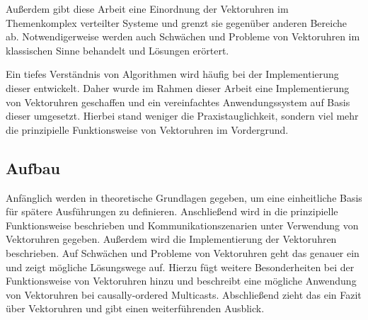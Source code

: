 Außerdem gibt diese Arbeit eine Einordnung der Vektoruhren im Themenkomplex verteilter Systeme und grenzt sie gegenüber anderen Bereiche ab.
Notwendigerweise werden auch Schwächen und Probleme von Vektoruhren im klassischen Sinne behandelt und Lösungen erörtert.

Ein tiefes Verständnis von Algorithmen wird häufig bei der Implementierung dieser entwickelt.
Daher wurde im Rahmen dieser Arbeit eine Implementierung von Vektoruhren geschaffen und ein vereinfachtes Anwendungssystem auf Basis dieser umgesetzt.
Hierbei stand weniger die Praxistauglichkeit, sondern viel mehr die prinzipielle Funktionsweise von Vektoruhren im Vordergrund.

\subsection{Aufbau}
Anfänglich werden in  theoretische Grundlagen gegeben, um eine einheitliche Basis für spätere Ausführungen zu definieren.
Anschließend wird in  die prinzipielle Funktionsweise beschrieben und Kommunikationszenarien unter Verwendung von Vektoruhren gegeben. 
Außerdem wird die Implementierung der Vektoruhren beschrieben.
Auf Schwächen und Probleme von Vektoruhren geht das  genauer ein und zeigt mögliche Lösungswege auf.
Hierzu fügt  weitere Besonderheiten bei der Funktionsweise von Vektoruhren hinzu und beschreibt eine mögliche Anwendung von Vektoruhren bei causally-ordered Multicasts.
Abschließend zieht das  ein Fazit über Vektoruhren und gibt einen weiterführenden Ausblick.
    
  
